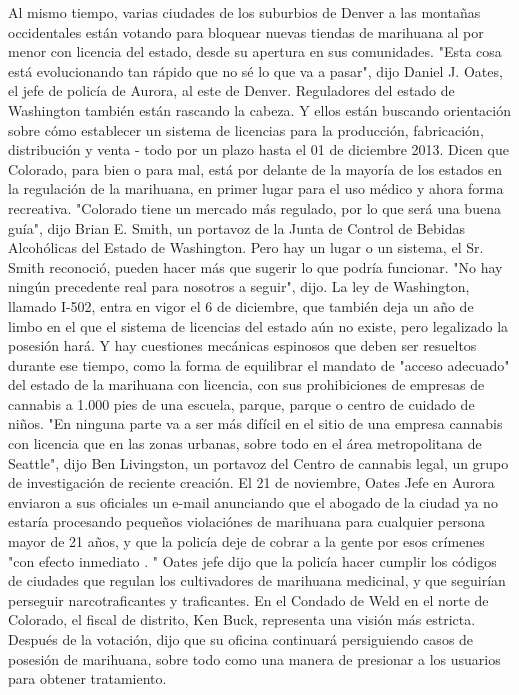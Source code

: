 Al mismo tiempo, varias ciudades de los suburbios de Denver a las montañas occidentales están votando para bloquear nuevas tiendas de marihuana al por menor con licencia del estado, desde su apertura en sus comunidades.
"Esta cosa está evolucionando tan rápido que no sé lo que va a pasar", dijo Daniel J. Oates, el jefe de policía de Aurora, al este de Denver.
Reguladores del estado de Washington también están rascando la cabeza.
Y ellos están buscando orientación sobre cómo establecer un sistema de licencias para la producción, fabricación, distribución y venta - todo por un plazo hasta el 01 de diciembre 2013.
Dicen que Colorado, para bien o para mal, está por delante de la mayoría de los estados en la regulación de la marihuana, en primer lugar para el uso médico y ahora forma recreativa.
"Colorado tiene un mercado más regulado, por lo que será una buena guía", dijo Brian E. Smith, un portavoz de la Junta de Control de Bebidas Alcohólicas del Estado de Washington.
Pero hay un lugar o un sistema, el Sr. Smith reconoció, pueden hacer más que sugerir lo que podría funcionar.
"No hay ningún precedente real para nosotros a seguir", dijo.
La ley de Washington, llamado I-502, entra en vigor el 6 de diciembre, que también deja un año de limbo en el que el sistema de licencias del estado aún no existe, pero legalizado la posesión hará.
Y hay cuestiones mecánicas espinosos que deben ser resueltos durante ese tiempo, como la forma de equilibrar el mandato de "acceso adecuado" del estado de la marihuana con licencia, con sus prohibiciones de empresas de cannabis a 1.000 pies de una escuela, parque, parque o centro de cuidado de niños.
"En ninguna parte va a ser más difícil en el sitio de una empresa cannabis con licencia que en las zonas urbanas, sobre todo en el área metropolitana de Seattle", dijo Ben Livingston, un portavoz del Centro de cannabis legal, un grupo de investigación de reciente creación.
El 21 de noviembre, Oates Jefe en Aurora enviaron a sus oficiales un e-mail anunciando que el abogado de la ciudad ya no estaría procesando pequeños violaciónes de marihuana para cualquier persona mayor de 21 años, y que la policía deje de cobrar a la gente por esos crímenes "con efecto inmediato . "
Oates jefe dijo que la policía hacer cumplir los códigos de ciudades que regulan los cultivadores de marihuana medicinal, y que seguirían perseguir narcotraficantes y traficantes.
En el Condado de Weld en el norte de Colorado, el fiscal de distrito, Ken Buck, representa una visión más estricta.
Después de la votación, dijo que su oficina continuará persiguiendo casos de posesión de marihuana, sobre todo como una manera de presionar a los usuarios para obtener tratamiento.
